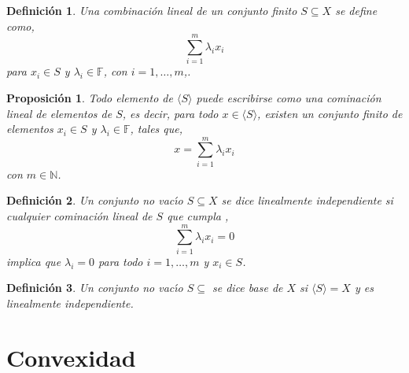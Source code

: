 \documentclass[12pt]{book}
\newtheorem{defn}{\bf Definición}[chapter]
\newtheorem{prop}{\bf Proposición}[chapter]
\begin{document}
\begin{defn} Una combinaci\'on lineal de un conjunto finito $S\subseteq X$ se define como,
$$\sum_{i=1}^m \lambda_i x_i$$
para $x_i\in S$ y $\lambda_i\in\mathbb{F} $, con $i=1,\dots,m$,.
\end{defn}

\begin{prop} Todo elemento de $\langle S\rangle$ puede escribirse como una cominaci\'on lineal de 
elementos de $S$, es decir, para todo  $x\in \langle S\rangle$, existen un conjunto finito de 
elementos $x_i\in S$ y $\lambda_i\in\mathbb{F} $, tales que,
$$ x=\sum_{i=1}^m  \lambda_i x_i$$
con $m\in\mathbb{N}$.
\end{prop}
 
 
\begin{defn} Un conjunto no vac\'{\i}o $S\subseteq X$  se dice linealmente independiente si 
cualquier cominaci\'on lineal de $S$ que cumpla ,
$$\sum_{i=1}^m \lambda_i x_i =0$$
implica que $\lambda_i =0$ para todo $i=1,\dots,m$ y $x_i\in S$.
\end{defn}
 

\begin{defn} Un conjunto no vac\'{\i}o $S\subseteq$ se dice base de $X$ si $\langle S\rangle=X$ y 
es linealmente independiente.
\end{defn}

\section{Convexidad}
\end{document}
